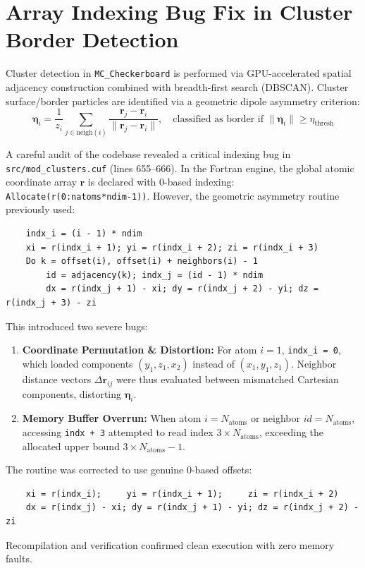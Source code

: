 \documentclass[11pt,a4paper]{article}
\begin{document}
\section{Array Indexing Bug Fix in Cluster Border Detection}

Cluster detection in \texttt{MC\_Checkerboard} is performed via GPU-accelerated spatial adjacency construction combined with breadth-first search (DBSCAN). Cluster surface/border particles are identified via a geometric dipole asymmetry criterion:
\begin{equation}
\bm{\eta}_i = \frac{1}{z_i} \sum_{j \in \text{neigh}(i)} \frac{\mathbf{r}_j - \mathbf{r}_i}{\|\mathbf{r}_j - \mathbf{r}_i\|}, \quad \text{classified as border if } \|\bm{\eta}_i\| \ge \eta_{\mathrm{thresh}}
\end{equation}

A careful audit of the codebase revealed a critical indexing bug in \texttt{src/mod\_clusters.cuf} (lines 655--666). In the Fortran engine, the global atomic coordinate array $\mathbf{r}$ is declared with 0-based indexing: \texttt{Allocate(r(0:natoms*ndim-1))}. However, the geometric asymmetry routine previously used:
\begin{verbatim}
    indx_i = (i - 1) * ndim
    xi = r(indx_i + 1); yi = r(indx_i + 2); zi = r(indx_i + 3)
    Do k = offset(i), offset(i) + neighbors(i) - 1
        id = adjacency(k); indx_j = (id - 1) * ndim
        dx = r(indx_j + 1) - xi; dy = r(indx_j + 2) - yi; dz = r(indx_j + 3) - zi
\end{verbatim}
This introduced two severe bugs:
\begin{enumerate}
    \item \textbf{Coordinate Permutation \& Distortion:} For atom $i=1$, \texttt{indx\_i = 0}, which loaded components $(y_1, z_1, x_2)$ instead of $(x_1, y_1, z_1)$. Neighbor distance vectors $\Delta \mathbf{r}_{ij}$ were thus evaluated between mismatched Cartesian components, distorting $\bm{\eta}_i$.
    \item \textbf{Memory Buffer Overrun:} When atom $i = N_{\mathrm{atoms}}$ or neighbor $id = N_{\mathrm{atoms}}$, accessing \texttt{indx + 3} attempted to read index $3 \times N_{\mathrm{atoms}}$, exceeding the allocated upper bound $3 \times N_{\mathrm{atoms}} - 1$.
\end{enumerate}
The routine was corrected to use genuine 0-based offsets:
\begin{verbatim}
    xi = r(indx_i);     yi = r(indx_i + 1);     zi = r(indx_i + 2)
    dx = r(indx_j) - xi; dy = r(indx_j + 1) - yi; dz = r(indx_j + 2) - zi
\end{verbatim}
Recompilation and verification confirmed clean execution with zero memory faults.
\end{document}

